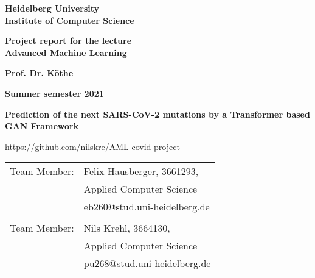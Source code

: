 \documentclass[
     12pt,         %
     a4paper,      %
     BCOR10mm,     %
     DIV14,        %
     ]{article}
\theoremstyle{defi}
\begin{document}
\begin{titlepage}

\vspace*{1cm}
\begin{center}
\textbf{ 
\Large Heidelberg University\\
\smallskip
\Large Institute of Computer Science\\
\smallskip
}

\vspace{3cm}

\textbf{\large Project report for the lecture\\ Advanced Machine Learning}

\vspace{1.5cm}
\textbf{Prof. Dr. Köthe}

\textbf{Summer semester 2021}

\vspace{1.5cm}
{\Large
\textbf{Prediction of the next SARS-CoV-2 mutations by a Transformer based GAN Framework}
}
\vspace{1cm}

\url{https://github.com/nilskre/AML-covid-project}

\end{center}

\vfill 

{\large
\begin{tabular}[l]{ll}
Team Member: & Felix Hausberger, 3661293,\\
  & Applied Computer Science\\
  & eb260@stud.uni-heidelberg.de\\
  & \\
Team Member: & Nils Krehl, 3664130,\\
  & Applied Computer Science\\
  & pu268@stud.uni-heidelberg.de\\
  
\end{tabular}
}

\end{titlepage}

% 



\newpage
\tableofcontents
\newpage











\clearpage
{}
% 


\newpage
\printbibliography
\end{document}
